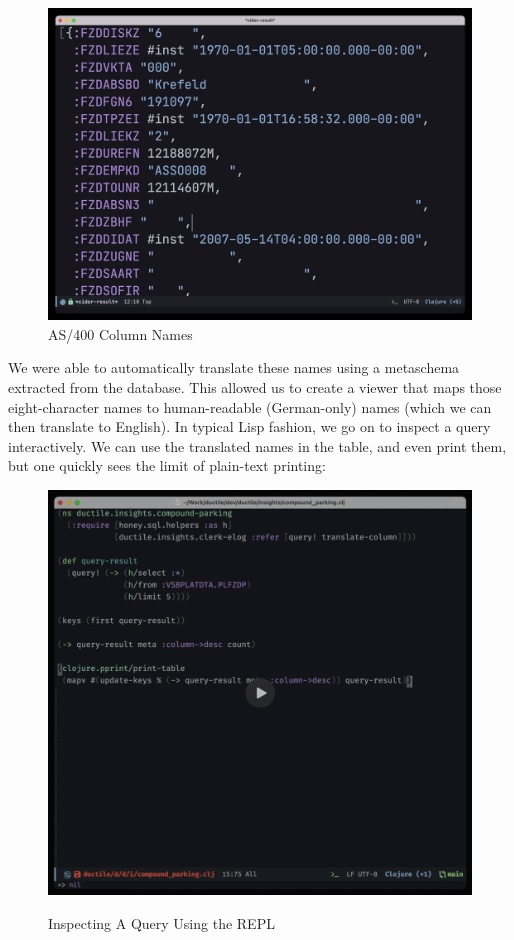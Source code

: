 \documentclass[sigconf,screen]{acmart}
\begin{document}
\begin{figure}
\hypertarget{as400-column-names}{%
\centering
\includegraphics{images/as400-column-names.png}
\caption{AS/400 Column Names}\label{as400-column-names}
}
\end{figure}

We were able to automatically translate these names using a metaschema extracted from the database. This allowed us to create a viewer that maps those eight-character names to human-readable (German-only) names (which we can then translate to English). In typical Lisp fashion, we go on to inspect a query interactively. We can use the translated names in the table, and even print them, but one quickly sees the limit of plain-text printing:

\begin{figure}
\hypertarget{inspecting-a-query-using-the-repl}{%
\centering
\href{https://cdn.nextjournal.com/data/QmbGFKpEXLGyqngHe7q1dqAsEAWfotSHG8XxYZPQfHirQ1?content-type=video/mp4}{\includegraphics{images/inspecting-a-query-using-the-repl.png}}
\caption{Inspecting A Query Using the REPL}\label{inspecting-a-query-using-the-repl}
}
\end{figure}
\end{document}
